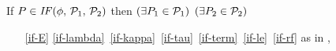   \noindent
  \begin{minipage}{1.0\linewidth}
  If $\aPS \in \sIF{\aForm}\sTHEN\aPSS_1\sELSE\aPSS_2\sFI$ then
  $(\exists P_1\in\mathcal{P}_1)$ $(\exists P_2\in\mathcal{P}_2)$
  \begin{multicols}{2}
    \begin{enumerate}[topsep=0pt,label=(\textsc{i}\arabic*),ref=\textsc{i}\arabic*]
    \item[\eqref{if-E}]
      \eqref{if-lambda}\,
      \eqref{if-kappa}\,
      \eqref{if-tau}\,
      \eqref{if-term}\,
      \eqref{if-le}\, 
      \eqref{if-rf}
      as in
      ,
      \setcounter{enumi}{\value{le}}

\end{enumerate}
\end{multicols}
\end{minipage}
